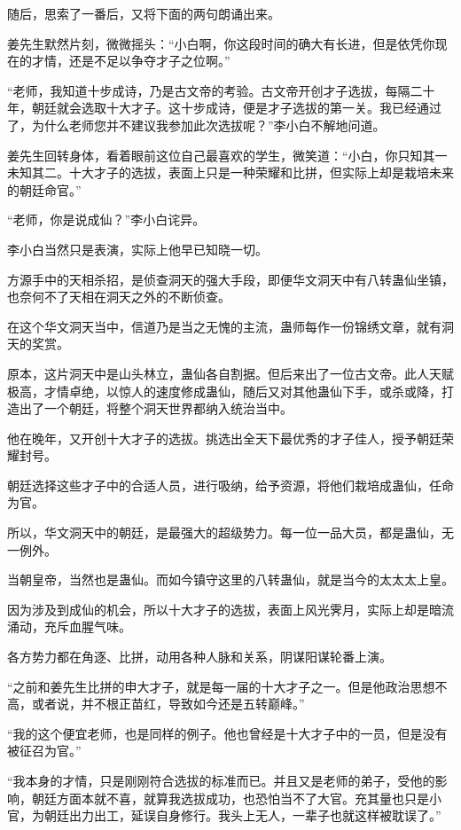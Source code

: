 \begin{this_body}
随后，思索了一番后，又将下面的两句朗诵出来。

姜先生默然片刻，微微摇头：“小白啊，你这段时间的确大有长进，但是依凭你现在的才情，还是不足以争夺才子之位啊。”

“老师，我知道十步成诗，乃是古文帝的考验。古文帝开创才子选拔，每隔二十年，朝廷就会选取十大才子。这十步成诗，便是才子选拔的第一关。我已经通过了，为什么老师您并不建议我参加此次选拔呢？”李小白不解地问道。

姜先生回转身体，看着眼前这位自己最喜欢的学生，微笑道：“小白，你只知其一未知其二。十大才子的选拔，表面上只是一种荣耀和比拼，但实际上却是栽培未来的朝廷命官。”

“老师，你是说成仙？”李小白诧异。

李小白当然只是表演，实际上他早已知晓一切。

方源手中的天相杀招，是侦查洞天的强大手段，即便华文洞天中有八转蛊仙坐镇，也奈何不了天相在洞天之外的不断侦查。

在这个华文洞天当中，信道乃是当之无愧的主流，蛊师每作一份锦绣文章，就有洞天的奖赏。

原本，这片洞天中是山头林立，蛊仙各自割据。但后来出了一位古文帝。此人天赋极高，才情卓绝，以惊人的速度修成蛊仙，随后又对其他蛊仙下手，或杀或降，打造出了一个朝廷，将整个洞天世界都纳入统治当中。

他在晚年，又开创十大才子的选拔。挑选出全天下最优秀的才子佳人，授予朝廷荣耀封号。

朝廷选择这些才子中的合适人员，进行吸纳，给予资源，将他们栽培成蛊仙，任命为官。

所以，华文洞天中的朝廷，是最强大的超级势力。每一位一品大员，都是蛊仙，无一例外。

当朝皇帝，当然也是蛊仙。而如今镇守这里的八转蛊仙，就是当今的太太太上皇。

因为涉及到成仙的机会，所以十大才子的选拔，表面上风光霁月，实际上却是暗流涌动，充斥血腥气味。

各方势力都在角逐、比拼，动用各种人脉和关系，阴谋阳谋轮番上演。

“之前和姜先生比拼的申大才子，就是每一届的十大才子之一。但是他政治思想不高，或者说，并不根正苗红，导致如今还是五转巅峰。”

“我的这个便宜老师，也是同样的例子。他也曾经是十大才子中的一员，但是没有被征召为官。”

“我本身的才情，只是刚刚符合选拔的标准而已。并且又是老师的弟子，受他的影响，朝廷方面本就不喜，就算我选拔成功，也恐怕当不了大官。充其量也只是小官，为朝廷出力出工，延误自身修行。我头上无人，一辈子也就这样被耽误了。”


\end{this_body}

